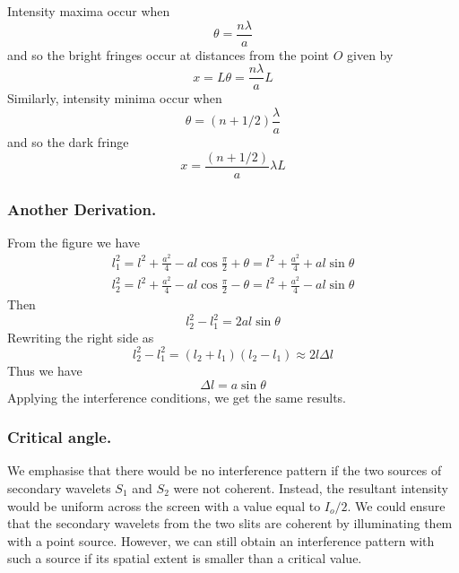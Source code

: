 \documentclass[../../../main.tex]{subfiles}
\begin{document}
Intensity maxima occur when
\begin{equation*}
    \theta=\frac{n\lambda}{a}
\end{equation*}
and so the bright fringes occur at distances from the point $O$ given by
\begin{equation*}
    x=L\theta=\frac{n\lambda}{a}L
\end{equation*}
Similarly, intensity minima occur when
\begin{equation*}
    \theta=(n+1/2)\frac{\lambda}{a}
\end{equation*}
and so the dark fringe 
\begin{equation*}
    x=\frac{(n+1/2)}{a}\lambda L
\end{equation*}

\subsubsection*{Another Derivation.} From the figure we have 
\begin{align*}
    l_1^2=l^2+\frac{a^2}{4}-al\cos \frac{\pi}{2}+\theta=l^2+\frac{a^2}{4}+al\sin \theta\\
    l_2^2=l^2+\frac{a^2}{4}-al\cos \frac{\pi}{2}-\theta=l^2+\frac{a^2}{4}-al\sin \theta
\end{align*}
Then 
\begin{equation*}
    l_2^2- l_1^2=2al\sin\theta
\end{equation*}
Rewriting the right side as 
\begin{equation*}
    l_2^2- l_1^2=(l_2+l_1)(l_2-l_1)\approx 2l\Delta l
\end{equation*}
Thus we have 
\begin{equation*}
    \Delta l=a \sin \theta
\end{equation*}
Applying the interference conditions, we get the same results.

\subsubsection*{Critical angle.} We emphasise that there would be no interference pattern if the two sources of secondary wavelets $S_1$ and $S_2$ were not coherent. Instead, the resultant intensity would be uniform across the screen with a value equal to $I_o/2$. We could ensure that the secondary wavelets from the two slits are coherent  by illuminating them with a point source. However, we can still obtain an interference pattern with such a source if its spatial extent is smaller than a critical value.
\end{document}

